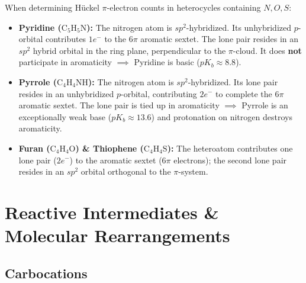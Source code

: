 \documentclass[10pt,twoside,openright]{book}
\begin{document}
\begin{usecasebox}
When determining Hückel $\pi$-electron counts in heterocycles containing $N, O, S$:
\begin{itemize}
  \item \textbf{Pyridine ($\mathrm{C_5H_5N}$):} The nitrogen atom is $sp^2$-hybridized. Its unhybridized $p$-orbital contributes $1e^-$ to the $6\pi$ aromatic sextet. The lone pair resides in an $sp^2$ hybrid orbital in the ring plane, perpendicular to the $\pi$-cloud. It does \textbf{not} participate in aromaticity $\implies$ Pyridine is basic ($pK_b \approx 8.8$).
  \item \textbf{Pyrrole ($\mathrm{C_4H_4NH}$):} The nitrogen atom is $sp^2$-hybridized. Its lone pair resides in an unhybridized $p$-orbital, contributing $2e^-$ to complete the $6\pi$ aromatic sextet. The lone pair is tied up in aromaticity $\implies$ Pyrrole is an exceptionally weak base ($pK_b \approx 13.6$) and protonation on nitrogen destroys aromaticity.
  \item \textbf{Furan ($\mathrm{C_4H_4O}$) \& Thiophene ($\mathrm{C_4H_4S}$):} The heteroatom contributes one lone pair ($2e^-$) to the aromatic sextet ($6\pi$ electrons); the second lone pair resides in an $sp^2$ orbital orthogonal to the $\pi$-system.
\end{itemize}
\end{usecasebox}

\section{Reactive Intermediates \& Molecular Rearrangements}

\subsection{Carbocations}
\end{document}
